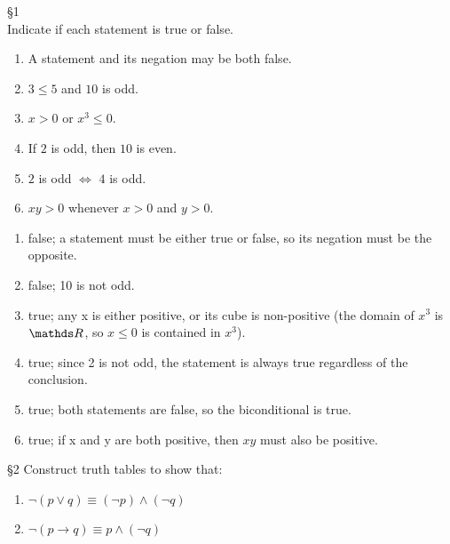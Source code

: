 \documentclass{homework}
\begin{document}
\begin{problem}{\S 1}\\
  Indicate if each statement is true or false.
  \begin{enumerate}[label=(\alph*)]
    \item A statement and its negation may be both false.
    \item $3\le 5$ and $10$ is odd.
    \item $x>0$ or $x^3\le 0$.
    \item If $2$ is odd, then $10$ is even.
    \item $2$ is odd $\iff$ $4$ is odd.
    \item $xy>0$ whenever $x>0$ and $y>0$.
  \end{enumerate}
\end{problem}
\begin{solution}
  \begin{enumerate}[label=(\alph*)]
    \item false; a statement must be either true or false, so its negation must be the opposite.
    \item false; 10 is not odd.
    \item true; any x is either positive, or its cube is non-positive (the domain of $x^3$ is $\R$, so
      $x\le 0$ is contained in $x^3$).
    \item true; since 2 is not odd, the statement is always true regardless of the conclusion.
    \item true; both statements are false, so the biconditional is true.
    \item true; if x and y are both positive, then $xy$ must also be positive.
  \end{enumerate}
\end{solution}

\begin{problem}{\S 2}
  Construct truth tables to show that:
  \begin{enumerate}
    \item $\neg \left( p\lor q \right) \equiv \left( \neg p \right) \land \left( \neg q \right) $
    \item $\neg\left( p \to q \right) \equiv p \land \left( \neg q \right) $
  \end{enumerate}
\end{problem}
\end{document}
